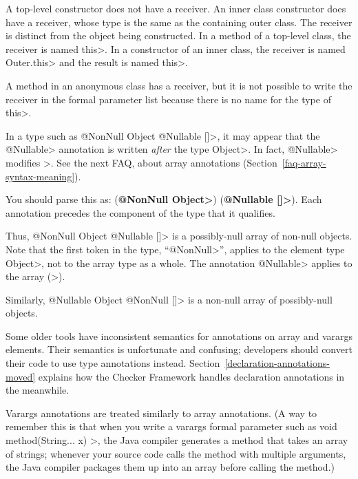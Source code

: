 A top-level constructor does not have a receiver.  An inner class
constructor does have a receiver, whose type is the same as the containing
outer class.  The receiver is distinct from the object being constructed.
In a method of a top-level class, the receiver is named \<this>.  In a
constructor of an inner class, the receiver is named \<Outer.this> and the
result is named \<this>.

A method in an anonymous class has a receiver, but it is not possible to
write the receiver in the formal parameter list because there is no name
for the type of \<this>.



In a type such as \<@NonNull Object @Nullable []>, it may appear that the
\<@Nullable> annotation is written \emph{after} the type \<Object>.  In
fact, \<@Nullable> modifies \<[]>.  See the next FAQ, about array
annotations (Section~\ref{faq-array-syntax-meaning}).



You should parse this as:
(\textbf{\<@NonNull Object>}) (\textbf{\<@Nullable []>}).
Each annotation precedes the component of the type that it qualifies.

Thus,
\<@NonNull Object @Nullable []> is a possibly-null array of non-null
objects.  Note that the first token in the type,
``\<@NonNull>'', applies to the element
type \<Object>, not to the array type as a whole.  The annotation \<@Nullable> applies to the
array (\<[]>).

Similarly,
\<@Nullable Object @NonNull []> is a non-null array of possibly-null
objects.

Some older tools have inconsistent semantics for annotations on array and
varargs elements.  Their semantics is unfortunate and confusing; developers
should convert their code to use type annotations instead.
Section~\ref{declaration-annotations-moved} explains how the Checker
Framework handles declaration annotations in the meanwhile.



Varargs annotations are treated similarly to array annotations.
(A way to remember this is that
when you write a varargs formal parameter such as
\<void method(String... x) \ttlcb\ttrcb>, the Java compiler generates a
method that takes an array of strings; whenever your source code calls the
method with multiple arguments, the Java compiler packages them up into an
array before calling the method.)

